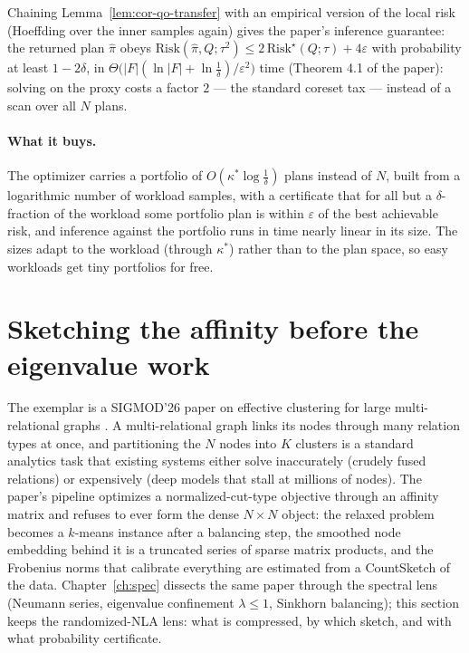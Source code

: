 Chaining Lemma~\ref{lem:cor-qo-transfer} with an empirical version of
the local risk (Hoeffding over the inner samples again) gives the
paper's inference guarantee: the returned plan $\hat{\pi}$ obeys
$\mathrm{Risk}(\hat{\pi},Q;\tau^2) \le
2\,\mathrm{Risk}^{\star}(Q;\tau) + 4\varepsilon$ with probability at
least $1-2\delta$, in $\Theta\bigl(|F|(\ln|F| +
\ln\tfrac1\delta)/\varepsilon^2\bigr)$ time (Theorem 4.1 of the paper):
solving on the proxy costs a factor $2$ --- the standard coreset tax ---
instead of a scan over all $N$ plans.

\paragraph{What it buys.}
The optimizer carries a portfolio of $O(\kappa^*\log\frac1\delta)$
plans instead of $N$, built from a logarithmic number of workload
samples, with a certificate that for all but a $\delta$-fraction of the
workload some portfolio plan is within $\varepsilon$ of the best
achievable risk, and inference against the portfolio runs in time
nearly linear in its size. The sizes adapt to the workload (through
$\kappa^*$) rather than to the plan space, so easy workloads get tiny
portfolios for free.

\section{Sketching the affinity before the eigenvalue work}
\label{sec:cor-mrg}

The exemplar is a SIGMOD'26 paper on effective clustering for large
multi-relational graphs \citep{sigmod26-303}. A multi-relational graph
links its nodes through many relation types at once, and partitioning
the $N$ nodes into $K$ clusters is a standard analytics task that
existing systems either solve inaccurately (crudely fused relations) or
expensively (deep models that stall at millions of nodes). The paper's
pipeline optimizes a normalized-cut-type objective through an affinity
matrix and refuses to ever form the dense $N \times N$ object: the
relaxed problem becomes a $k$-means instance after a balancing step,
the smoothed node embedding behind it is a truncated series of sparse
matrix products, and the Frobenius norms that calibrate everything are
estimated from a CountSketch of the data. Chapter~\ref{ch:spec}
dissects the same paper through the spectral lens (Neumann series,
eigenvalue confinement $\lambda \le 1$, Sinkhorn balancing); this
section keeps the randomized-NLA lens: what is compressed, by which
sketch, and with what probability certificate.

